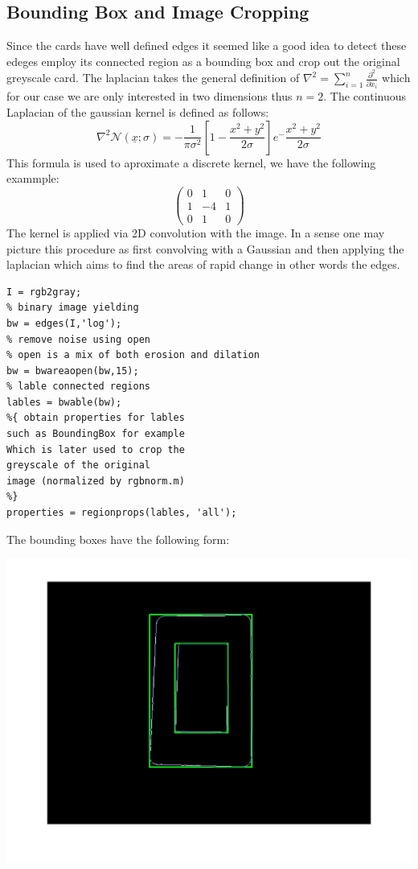 \documentclass[11pt]{article}
\theoremstyle{plain}
\theoremstyle{definition}
\begin{document}
\subsection{Bounding Box and Image Cropping}
Since the cards have well defined edges it seemed like a good idea to detect these edeges
employ its connected region as a bounding box and crop out the original greyscale card.
\newline
\newline
The laplacian takes the general definition of $\nabla^{2} = \sum_{i=1}^{n}\frac{\partial^2}{\partial x_{i}}$ which for our case we are only interested in two dimensions thus $n=2$.
The continuous Laplacian of the gaussian kernel is defined as follows:
\begin{equation*}
\nabla^{2}\mathcal{N}(\underline{x};\sigma)= -\frac{1}{\pi \sigma^{2}}\left[ 1 -\frac{x^{2} + y^{2}}{2\sigma}\right]e^-\frac{x^{2} + y^{2} }{2\sigma}
\end{equation*}
This formula is used to aproximate a discrete kernel, we have the following exammple:
\[
\begin{pmatrix}
  0 & 1 & 0 \\
  1 & -4 & 1 \\
  0 & 1 & 0
 \end{pmatrix}
\]
The kernel is applied via 2D convolution with the image. In a sense one may picture this procedure as first convolving with a Gaussian and then applying the laplacian which aims to find the areas of rapid change in other words the edges.
\newline
\newline
\begin{lstlisting}
I = rgb2gray;
% binary image yielding 
bw = edges(I,'log');
% remove noise using open
% open is a mix of both erosion and dilation
bw = bwareaopen(bw,15);
% lable connected regions
lables = bwable(bw);
%{ obtain properties for lables
such as BoundingBox for example
Which is later used to crop the 
greyscale of the original 
image (normalized by rgbnorm.m)
%}
properties = regionprops(lables, 'all');
\end{lstlisting}
The bounding boxes have the following form:
\begin{center}
\includegraphics[scale=0.2]{convex_hull_main.jpg}
\end{center}
\end{document}
